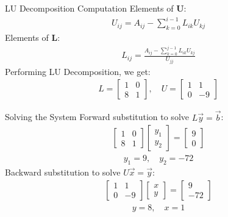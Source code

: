 \documentclass{beamer}
\begin{document}
\begin{frame}{LU Decomposition Computation}
    Elements of \textbf{U}:
    \begin{align}
        U_{ij} = A_{ij} - \sum_{k=0}^{i-1} L_{ik} U_{kj}
    \end{align}
    Elements of \textbf{L}:
    \begin{align}
        L_{ij} = \frac{A_{ij} - \sum_{k=0}^{j-1} L_{ik} U_{kj}}{U_{jj}}
    \end{align}
    Performing LU Decomposition, we get:
    \begin{align}
        L = \begin{bmatrix}1 & 0 \\ 8 & 1\end{bmatrix}, \quad U = \begin{bmatrix}1 & 1 \\ 0 & -9\end{bmatrix}
    \end{align}
\end{frame}

\begin{frame}{Solving the System}
    Forward substitution to solve $L\vec{y} = \vec{b}$:
    \begin{align}
        \begin{bmatrix}1 & 0 \\ 8 & 1\end{bmatrix} \begin{bmatrix}y_1 \\ y_2\end{bmatrix} = \begin{bmatrix}9 \\ 0\end{bmatrix}
    \end{align}
    \begin{align}
        y_1 = 9, \quad y_2 = -72
    \end{align}
    Backward substitution to solve $U\vec{x} = \vec{y}$:
    \begin{align}
        \begin{bmatrix}1 & 1 \\ 0 & -9\end{bmatrix} \begin{bmatrix}x \\ y\end{bmatrix} = \begin{bmatrix}9 \\ -72\end{bmatrix}
    \end{align}
    \begin{align}
        y = 8, \quad x = 1
    \end{align}
\end{frame}
\end{document}
